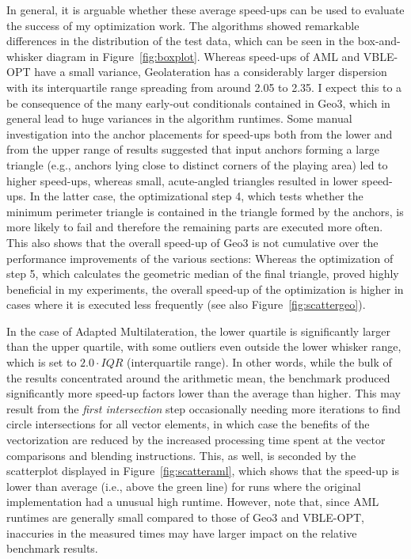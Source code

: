 In general, it is arguable whether these average speed-ups can be used to evaluate the success of my optimization work. The algorithms showed remarkable differences in the distribution of the test data, which can be seen in the box-and-whisker diagram in Figure~\ref{fig:boxplot}. Whereas speed-ups of AML and VBLE-OPT have a small variance, Geolateration has a considerably larger dispersion with its interquartile range spreading from around 2.05 to 2.35. I expect this to a be consequence of the many early-out conditionals contained in Geo3, which in general lead to huge variances in the algorithm runtimes. Some manual investigation into the anchor placements for speed-ups both from the lower and from the upper range of results suggested that input anchors forming a large triangle (e.g., anchors lying close to distinct corners of the playing area) led to higher speed-ups, whereas small, acute-angled triangles resulted in lower speed-ups. In the latter case, the optimizational step 4, which tests whether the minimum perimeter triangle is contained in the triangle formed by the anchors, is more likely to fail and therefore the remaining parts are executed more often. This also shows that the overall speed-up of Geo3 is not cumulative over the performance improvements of the various sections: Whereas the optimization of step 5, which calculates the geometric median of the final triangle, proved highly beneficial in my experiments, the overall speed-up of the optimization is higher in cases where it is executed less frequently (see also Figure~\ref{fig:scattergeo}).

In the case of Adapted Multilateration, the lower quartile is significantly larger than the upper quartile, with some outliers even outside the lower whisker range, which is set to $2.0 \cdot IQR$ (interquartile range). In other words, while the bulk of the results concentrated around the arithmetic mean, the benchmark produced significantly more speed-up factors lower than the average than higher. This may result from the \emph{first intersection} step occasionally needing more iterations to find circle intersections for all vector elements, in which case the benefits of the vectorization are reduced by the increased processing time spent at the vector comparisons and blending instructions. This, as well, is seconded by the scatterplot displayed in Figure~\ref{fig:scatteraml}, which shows that the speed-up is lower than average (i.e., above the green line) for runs where the original implementation had a unusual high runtime. However, note that, since AML runtimes are generally small compared to those of Geo3 and VBLE-OPT, inaccuries in the measured times may have larger impact on the relative benchmark results.

